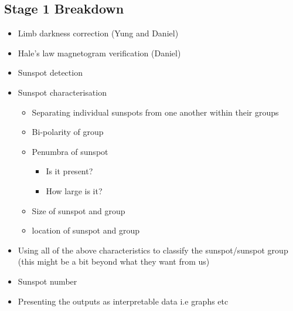 \documentclass[a4paper]{article}
\begin{document}
\subsection{Stage 1 Breakdown}
\begin{itemize}
    \item Limb darkness correction (Yung and Daniel)
    \item Hale's law magnetogram verification (Daniel)
    \item Sunspot detection
    \item Sunspot characterisation
    \begin{itemize}
        \item Separating individual sunspots from one another within their groups
        \item Bi-polarity of group
        \item Penumbra of sunspot
        \begin{itemize}
            \item Is it present?
            \item How large is it?
        \end{itemize}
        \item Size of sunspot and group
        \item location of sunspot and group
    \end{itemize}
    \item Using all of the above characteristics to classify the sunspot/sunspot group (this might be a bit beyond what they want from us)
    \item Sunspot number
    \item Presenting the outputs as interpretable data i.e graphs etc
\end{itemize}
\end{document}
